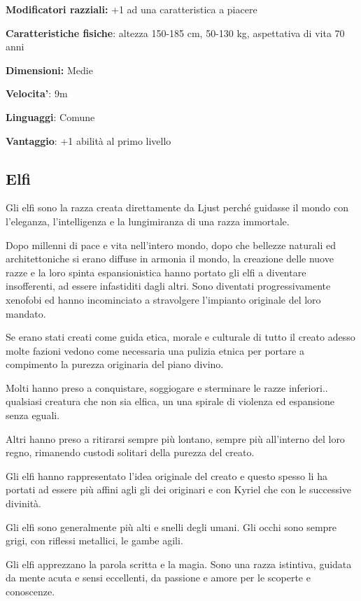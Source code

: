 \documentclass[a4paper,11pt,twoside,openany]{book}
\begin{document}
\textbf{Modificatori razziali:} +1 ad una caratteristica a piacere

\textbf{Caratteristiche fisiche}: altezza 150-185 cm, 50-130 kg, aspettativa di vita 70 anni

\textbf{Dimensioni:} Medie

\textbf{Velocita'}: 9m

\textbf{Linguaggi}: Comune

\textbf{Vantaggio}: +1 abilità al primo livello

\subsection{Elfi}

\label{elfi}

Gli elfi sono la razza creata direttamente da Ljust perché guidasse il mondo con l'eleganza, l'intelligenza e la lungimiranza di una razza immortale.

Dopo millenni di pace e vita nell'intero mondo, dopo che bellezze naturali ed architettoniche si erano diffuse in armonia il mondo, la creazione delle nuove razze e la loro spinta espansionistica hanno portato gli elfi a diventare insofferenti, ad essere infastiditi dagli altri.
Sono diventati progressivamente xenofobi ed hanno incominciato a stravolgere l'impianto originale del loro mandato.

Se erano stati creati come guida etica, morale e culturale di tutto il creato adesso molte fazioni vedono come necessaria una pulizia etnica per portare a compimento la purezza originaria del piano divino.

Molti hanno preso a conquistare, soggiogare e sterminare le razze inferiori.. qualsiasi creatura che non sia elfica, un una spirale di violenza ed espansione senza eguali.

Altri hanno preso a ritirarsi sempre più lontano, sempre più all'interno del loro regno, rimanendo custodi solitari della purezza del creato.

Gli elfi hanno rappresentato l'idea originale del creato e questo spesso li ha portati ad essere più affini agli gli dei originari e con Kyriel che con le successive divinità.

Gli elfi sono generalmente più alti e snelli degli umani. Gli occhi sono sempre grigi, con riflessi metallici, le gambe agili.

Gli elfi apprezzano la parola scritta e la magia. Sono una razza istintiva, guidata da mente acuta e sensi eccellenti, da passione e amore per le scoperte e conoscenze.
\end{document}
